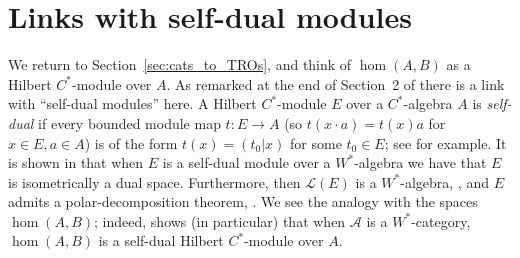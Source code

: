 \documentclass[a4paper,11pt]{article}
\theoremstyle{plain}
\theoremstyle{remark}
\newcommand{\mc}[1]{\mathcal{#1}}
\begin{document}
\section{Links with self-dual modules}\label{sec:self-dual}

We return to Section~\ref{sec:cats_to_TROs}, and think of $\hom(A,B)$ as a Hilbert $C^*$-module over $A$.  As remarked at the end of Section~2 of \cite{GLR_Wstar_categories} there is a link with ``self-dual modules'' here.  A Hilbert $C^*$-module $E$ over a $C^*$-algebra $A$ is \emph{self-dual} if every bounded module map $t \colon E \to A$ (so $t(x\cdot a) = t(x)a$ for $x\in E, a\in A$) is of the form $t(x) = (t_0|x)$ for some $t_0\in E$; see \cite{paschke_inner_prod_mods} for example.  It is shown in \cite[Proposition~3.8]{paschke_inner_prod_mods} that when $E$ is a self-dual module over a $W^*$-algebra we have that $E$ is isometrically a dual space.  Furthermore, then $\mc L(E)$ is a $W^*$-algebra, \cite[Proposition~3.10]{paschke_inner_prod_mods}, and $E$ admits a polar-decomposition theorem, \cite[Proposition~3.11]{paschke_inner_prod_mods}.  We see the analogy with the spaces $\hom(A,B)$; indeed, \cite[Proposition~2.14]{GLR_Wstar_categories} shows (in particular) that when $\mc A$ is a $W^*$-category, $\hom(A,B)$ is a self-dual Hilbert $C^*$-module over $A$.
\end{document}
